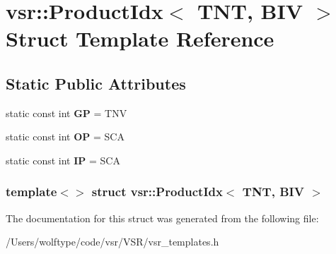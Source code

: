 \hypertarget{structvsr_1_1_product_idx_3_01_t_n_t_00_01_b_i_v_01_4}{\section{vsr\-:\-:Product\-Idx$<$ T\-N\-T, B\-I\-V $>$ Struct Template Reference}
\label{structvsr_1_1_product_idx_3_01_t_n_t_00_01_b_i_v_01_4}
}
\subsection*{Static Public Attributes}
\begin{DoxyCompactItemize}
\item 
\hypertarget{structvsr_1_1_product_idx_3_01_t_n_t_00_01_b_i_v_01_4_a1cc8b400d1c185eb6124c2001fc81958}{static const int {\bfseries G\-P} = T\-N\-V}\label{structvsr_1_1_product_idx_3_01_t_n_t_00_01_b_i_v_01_4_a1cc8b400d1c185eb6124c2001fc81958}

\item 
\hypertarget{structvsr_1_1_product_idx_3_01_t_n_t_00_01_b_i_v_01_4_ab0cdf48f3df239fed24878d893954d63}{static const int {\bfseries O\-P} = S\-C\-A}\label{structvsr_1_1_product_idx_3_01_t_n_t_00_01_b_i_v_01_4_ab0cdf48f3df239fed24878d893954d63}

\item 
\hypertarget{structvsr_1_1_product_idx_3_01_t_n_t_00_01_b_i_v_01_4_afca87b25e80885d1dddc5b44019adb37}{static const int {\bfseries I\-P} = S\-C\-A}\label{structvsr_1_1_product_idx_3_01_t_n_t_00_01_b_i_v_01_4_afca87b25e80885d1dddc5b44019adb37}

\end{DoxyCompactItemize}
\subsubsection*{template$<$$>$ struct vsr\-::\-Product\-Idx$<$ T\-N\-T, B\-I\-V $>$}



The documentation for this struct was generated from the following file\-:\begin{DoxyCompactItemize}
\item 
/\-Users/wolftype/code/vsr/\-V\-S\-R/vsr\-\_\-templates.\-h\end{DoxyCompactItemize}
